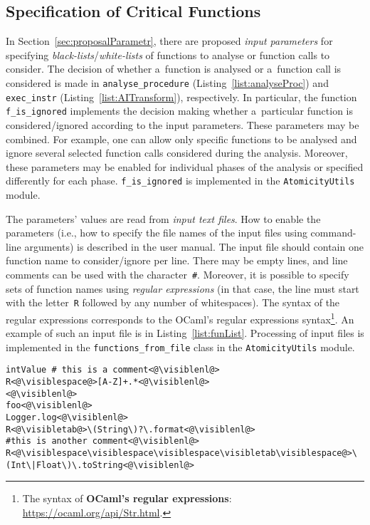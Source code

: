 \subsection{Specification of Critical Functions}
\label{sec:implementFunIgnore}

In Section~\ref{sec:proposalParametr}, there are proposed \emph{input parameters} for specifying \emph{black-lists}/\emph{white-lists} of functions to analyse or function calls to consider. The decision of whether a~function is analysed or a~function call is considered is made in \texttt{analyse\_procedure} (Listing~\ref{list:analyseProc}) and \texttt{exec\_instr} (Listing~\ref{list:AITransform}), respectively. In particular, the function \texttt{f\_is\_ignored} implements the decision making whether a~particular function is considered/ignored according to the input parameters. These parameters may be combined. For example, one can allow only specific functions to be analysed and ignore several selected function calls considered during the analysis. Moreover, these parameters may be enabled for individual phases of the analysis or specified differently for each phase. \texttt{f\_is\_ignored} is implemented in the \texttt{AtomicityUtils} module.

The parameters' values are read from \emph{input text files}. How to enable the parameters (i.e., how to specify the file names of the input files using command-line arguments) is described in the user manual. The input file should contain one function name to consider/ignore per line. There may be empty lines, and line comments can be used with the character~\texttt{\#}. Moreover, it is possible to specify sets of function names using \emph{regular expressions} (in that case, the line must start with the letter~\texttt{R} followed by any number of whitespaces). The syntax of the regular expressions corresponds to the OCaml's regular expressions syntax\footnote{The syntax of \textbf{OCaml's regular expressions}: \url{https://ocaml.org/api/Str.html}.}. An example of such an input file is in Listing~\ref{list:funList}. Processing of input files is implemented in the \texttt{functions\_from\_file} class in the \texttt{AtomicityUtils} module.

\begin{lstlisting}[style=plain, label={list:funList}, float=hbt, caption={An example of an \emph{input text file} with a~\emph{black-list}/\emph{white-list} of functions to analyse or function calls to consider}]
intValue # this is a comment<@\visiblenl@>
R<@\visiblespace@>[A-Z]+.*<@\visiblenl@>
<@\visiblenl@>
foo<@\visiblenl@>
Logger.log<@\visiblenl@>
R<@\visibletab@>\(String\)?\.format<@\visiblenl@>
#this is another comment<@\visiblenl@>
R<@\visiblespace\visiblespace\visiblespace\visibletab\visiblespace@>\(Int\|Float\)\.toString<@\visiblenl@>
\end{lstlisting}

